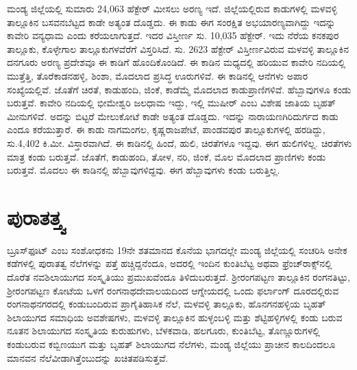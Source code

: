 ಮಂಡ್ಯ ಜಿಲ್ಲೆಯಲ್ಲಿ ಸುಮಾರು 24,063 ಹೆಕ್ಟೇರ್​ ಮೀಸಲು ಅರಣ್ಯ ಇದೆ. ಜಿಲ್ಲೆಯಲ್ಲಿರುವ ಕಾಡುಗಳಲ್ಲಿ ಮಳವಳ್ಳಿ ತಾಲ್ಲೂಕಿನ ಬಸವನಬೆಟ್ಟದ ಕಾಡೇ ಅತ್ಯಂತ ದೊಡ್ಡದು. ಈ ಕಾಡು ಈಗ ಸಂರಕ್ಷಿತ ಅಭಯಾರಣ್ಯವಾಗಿದ್ದು ಇದನ್ನು ಕಾವೇರಿ ವನ್ಯಧಾಮ ಎಂದು ಕರೆಯಲಾಗುತ್ತದೆ. ಇದರ ವಿಸ್ತೀರ್ಣ ಸು. 10,035 ಹೆಕ್ಟೇರ್​. ಇದು ನೆರೆಯ ಕನಕಪುರ ತಾಲ್ಲೂಕು, ಕೊಳ್ಳೇಗಾಲ ತಾಲ್ಲೂಕುಗಳವೆರೆಗೆ ವಿಸ್ತರಿಸಿದೆ. ಸು. 2623 ಹೆಕ್ಟೇರ್​ ವಿಸ್ತೀರ್ಣವಿರುವ ಮಳವಳ್ಳಿ ತಾಲ್ಲೂಕಿನ ದನಗೂರು ಅರಣ್ಯ ಪ್ರದೇಶವೂ ಈ ಕಾಡಿಗೆ ಹೊಂದಿಕೊಂಡಿದೆ. ಈ ಕಾಡಿನ ಮಧ್ಯದಲ್ಲಿ ಹರಿಯುವ ಕಾವೇರಿ ನದಿಯಲ್ಲಿ ಮುತ್ತೆತ್ತಿ, ತೊರೆಕಾಡನಹಳ್ಳಿ, ಶಿಂಶಾ, ಮೊದಲಾದ ಪ್ರಸಿದ್ಧ ಊರುಗಳಿವೆ. ಈ ಕಾಡಿನಲ್ಲಿ ಆನೆಗಳು ಅಪಾರ ಸಂಖ್ಯೆಯಲ್ಲಿವೆ. ಜೊತೆಗೆ ಚಿರತೆ, ಕಾಡುಹಂದಿ, ಜಿಂಕೆ, ಕಾಡೆಮ್ಮೆ ಮೊದಲಾದ ಕಾಡುಪ್ರಾಣಿಗಳಿವೆ. ಹೆಬ್ಬಾವುಗಳೂ ಕಂಡು ಬರುತ್ತವೆ. ಕಾವೇರಿ ನದಿಯಲ್ಲಿ ಭೀಮೇಶ್ವರಿ ಜಲಧಾಮ ಇದ್ದು, ಇಲ್ಲಿ ಮುಷೀರ್​ ಎಂಬ ವಿಶೇಷ ಜಾತಿಯ ಬೃಹತ್​ ಮೀನುಗಳಿವೆ. ಅದನ್ನು ಬಿಟ್ಟರೆ ಮೇಲುಕೋಟೆ ಕಾಡೇ ಅತ್ಯಂತ ದೊಡ್ಡದು. ಇದನ್ನು ನಾರಾಯಣಗಿರಿದುರ್ಗದ ಕಾಡು ಎಂದೂ ಕರೆಯುತ್ತಾರೆ. ಈ ಕಾಡು ನಾಗಮಂಗಲ, ಕೃಷ್ಣರಾಜಪೇಟೆ, ಪಾಂಡವಪುರ ತಾಲ್ಲೂಕುಗಳಲ್ಲಿ ಹರಡಿದ್ದು, ಸು.4,402 ಕಿ.ಮೀ. ವಿಸ್ತಾರವಾಗಿದೆ. ಈ ಕಾಡಿನಲ್ಲಿ ಹಿಂದೆ, ಹುಲಿ, ಚಿರತೆಗಳೂ ಇದ್ದವು. ಈಗ ಹುಲಿಗಳಿಲ್ಲ. ಚಿರತೆಗಳು ಮಾತ್ರ ಕಂಡು ಬರುತ್ತವೆ. ಜೊತೆಗೆ, ಕಾಡುಹಂದಿ, ತೋಳ, ನರಿ, ಜಿಂಕೆ, ಮೊಲ ಮೊದಲಾದ ಪ್ರಾಣಿಗಳು ಕಂಡು ಬರುತ್ತವೆ. ಮೊದಲು ಈ ಕಾಡಿನಲ್ಲಿ ಹೆಬ್ಬಾವುಗಳಿದ್ದವು. ಈಗ ಹೆಬ್ಬಾವುಗಳು ಕಂಡು ಬರುತ್ತಿಲ್ಲ.

\vskip -10pt

\section*{ಪುರಾತತ್ತ್ವ}

ಬ್ರೂಸ್​ಫೂಟ್​ ಎಂಬ ಸಂಶೋಧಕನು 19ನೇ ಶತಮಾನದ ಕೊನೆಯ ಭಾಗದಲ್ಲೇ ಮಂಡ್ಯ ಜಿಲ್ಲೆಯಲ್ಲಿ ಸಂಚರಿಸಿ ಅನೇಕ ಕಡೆಗಳಲ್ಲಿ ಪುರಾತತ್ವ ನೆಲೆಗಳನ್ನು ಪತ್ತೆ ಹಚ್ಚಿದ್ದನೆಂದೂ, ಅದರಲ್ಲಿ ಇಂದಿನ ಕುಂತಿಬೆಟ್ಟ ಅಥವಾ ಫ್ರೆಂಚ್​ರಾಕ್ಸ್​ನಲ್ಲಿ ದೊರೆತ ನವಶಿಲಾಯುಗದ ಸಂಸ್ಕೃತಿಯು ಪ್ರಮುಖವೆಂದೂ ತಿಳಿದುಬರುತ್ತದೆ. ಶ‍್ರೀರಂಗಪಟ್ಟಣ ತಾಲ್ಲೂಕಿನ ರಂಗನತಿಟ್ಟು, ಶ‍್ರೀರಂಗಪಟ್ಟಣ ಕೋಟೆಯ ಒಳಗೆ ರಂಗನಾಥದೇವಾಲಯದಿಂದ ಆಗ್ನೇಯದಲ್ಲಿ ಒಂದು ಫರ್ಲಾಂಗ್​ ದೂರದಲ್ಲಿರುವ ರಂಗನಾಥನಗರದಲ್ಲಿ ಕಂಡುಬಂದಿರುವ ಪ್ರಾಗೈತಿಹಾಸಿಕ ನೆಲೆ, ಮಳವಳ್ಳಿ ತಾಲ್ಲೂಕು, ಹೊನಗನಹಳ್ಳಿಯ ಬೃಹತ್​ ಶಿಲಾಯುಗದ ಸಮಾಧಿಯ ಅವಶೇಷಗಳು, ಮಳವಳ್ಳಿ ತಾಲ್ಲೂಕಿನ ಹುಳ್ಳಂಬಳ್ಳಿ ಮತ್ತು ಶೆಟ್ಟಿಹಳ್ಳಿಗಳಲ್ಲಿ ಕಂಡು ಬರುವ ನೂತನ ಶಿಲಾಯುಗದ ಸಂಸ್ಕೃತಿಯ ಕುರುಹುಗಳು, ಬೆಳಕವಾಡಿ, ಹಲಗೂರು, ಕುಂತಿಬೆಟ್ಟ, ತೊಣ್ಣೂರುಗಳಲ್ಲಿ ಕಂಡುಬರುವ ಕಬ್ಬಿಣಯುಗ ಮತ್ತು ಬೃಹತ್​ ಶಿಲಾಯುಗದ ನೆಲೆಗಳು, ಮಂಡ್ಯ ಜಿಲ್ಲೆಯು ಪ್ರಾಚೀನ ಕಾಲದಿಂದಲೂ ಮಾನವನ ನೆಲೆವೀಡಾಗಿತ್ತೆಂಬುದನ್ನು ಖಚಿತಪಡಿಸುತ್ತವೆ.

